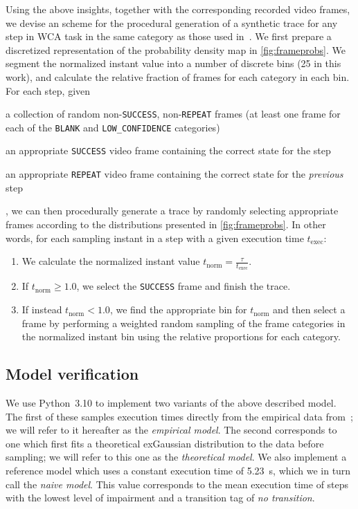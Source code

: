 Using the above insights, together with the corresponding recorded video frames, we devise an scheme for the procedural generation of a synthetic trace for any step in \ac{WCA} task in the same category as those used in~\cite{olguinmunoz:impact2021}.
We first prepare a discretized representation of the probability density map in \cref{fig:frameprobs}.
We segment the normalized instant value into a number of discrete bins (\num{25} in this work), and calculate the relative fraction of frames for each category in each bin.
For each step, given
\begin{enumerate*}[itemjoin={{; }}, itemjoin*={{; and }}]
    \item a collection of random non-\texttt{SUCCESS}, non-\texttt{REPEAT} frames (at least one frame for each of the \texttt{BLANK} and \texttt{LOW\_CONFIDENCE} categories)
    \item an appropriate \texttt{SUCCESS} video frame containing the correct state for the step
    \item an appropriate \texttt{REPEAT} video frame containing the correct state for the \emph{previous} step
\end{enumerate*},
we can then procedurally generate a trace by randomly selecting appropriate frames according to the distributions presented in \cref{fig:frameprobs}.
In other words, for each sampling instant in a step with a given execution time \( t_\text{exec} \):
\begin{enumerate}
    \item We calculate the normalized instant value \( t_\text{norm} = \frac{\tau}{t_\text{exec}} \).
    \item If \( t_\text{norm} \ge 1.0 \), we select the \texttt{SUCCESS} frame and finish the trace.
    \item If instead \( t_\text{norm} < 1.0 \), we find the appropriate bin for \( t_\text{norm} \) and then select a frame by performing a weighted random sampling of the frame categories in the normalized instant bin using the relative proportions for each category.
\end{enumerate}

\subsection{Model verification}\label{ssec:model:verification}

We use Python~\num{3.10} to implement two variants of the above described model.
The first of these samples execution times directly from the empirical data from~\cite{olguinmunoz:impact2021}; we will refer to it hereafter as the \emph{empirical model}.
The second corresponds to one which first fits a theoretical \ac{exGaussian} distribution to the data before sampling; we will refer to this one as the \emph{theoretical model}.
We also implement a reference model which uses a constant execution time of \SI{5.23}{\second}, which we in turn call the \emph{naive model}.
This value corresponds to the mean execution time of steps with the lowest level of impairment and a transition tag of \emph{no transition}.

